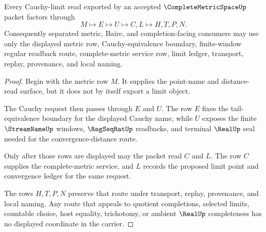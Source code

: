 \begin{theorem}
\label{thm:complete-metric-space-cauchy-limit-route}
Every Cauchy-limit read exported by an accepted $\CompleteMetricSpaceUp$ packet factors through
$$
M\longmapsto E\longmapsto U\longmapsto C,L\longmapsto H,T,P,N .
$$
Consequently separated metric, Baire, and completion-facing consumers may use only the displayed metric row, Cauchy-equivalence boundary, finite-window regular readback route, complete-metric service row, limit ledger, transport, replay, provenance, and local naming.
\end{theorem}
\begin{proof}
Begin with the metric row $M$. It supplies the point-name and distance-read surface, but it does not by itself export a limit object.

The Cauchy request then passes through $E$ and $U$. The row $E$ fixes the tail-equivalence boundary for the displayed Cauchy name, while $U$ exposes the finite $\StreamNameUp$ windows, $\RegSeqRatUp$ readbacks, and terminal $\RealUp$ seal needed for the convergence-distance route.

Only after those rows are displayed may the packet read $C$ and $L$. The row $C$ supplies the complete-metric service, and $L$ records the proposed limit point and convergence ledger for the same request.

The rows $H,T,P,N$ preserve that route under transport, replay, provenance, and local naming. Any route that appeals to quotient completions, selected limits, countable choice, host equality, trichotomy, or ambient $\RealUp$ completeness has no displayed coordinate in the carrier.
\end{proof}


\begin{closurestatus}{\CompleteMetricSpaceUp}
  \theoryclosure{\seedClosure}
  \formalstatus{\unformalizedV}
\end{closurestatus}
